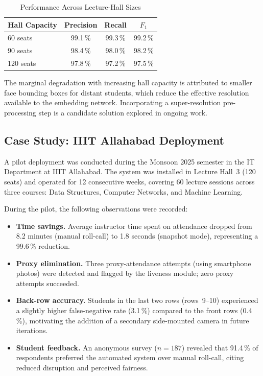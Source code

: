 \documentclass[conference, 10pt]{IEEEtran}
\begin{document}
\begin{table}[htbp]
\centering
\caption{Performance Across Lecture-Hall Sizes}
\label{tab:hall_sizes}
\begin{tabular}{lccc}
\toprule
\textbf{Hall Capacity} & \textbf{Precision} & \textbf{Recall} & \textbf{$F_1$} \\
\midrule
60 seats  & 99.1\,\% & 99.3\,\% & 99.2\,\% \\
90 seats  & 98.4\,\% & 98.0\,\% & 98.2\,\% \\
120 seats & 97.8\,\% & 97.2\,\% & 97.5\,\% \\
\bottomrule
\end{tabular}
\end{table}

The marginal degradation with increasing hall capacity is attributed to smaller face bounding
boxes for distant students, which reduce the effective resolution available to the embedding
network.  Incorporating a super-resolution pre-processing step is a candidate solution
explored in ongoing work.

\subsection{Case Study: IIIT Allahabad Deployment}

A pilot deployment was conducted during the Monsoon 2025 semester in the IT Department at
IIIT Allahabad.  The system was installed in Lecture Hall~3 (120 seats) and operated for
12 consecutive weeks, covering 60 lecture sessions across three courses: Data Structures,
Computer Networks, and Machine Learning.

During the pilot, the following observations were recorded:
\begin{itemize}
    \item \textbf{Time savings.}  Average instructor time spent on attendance dropped from
          8.2 minutes (manual roll-call) to 1.8 seconds (snapshot mode), representing a
          99.6\,\% reduction.
    \item \textbf{Proxy elimination.}  Three proxy-attendance attempts (using smartphone photos)
          were detected and flagged by the liveness module; zero proxy attempts succeeded.
    \item \textbf{Back-row accuracy.}  Students in the last two rows (rows~9--10) experienced a
          slightly higher false-negative rate (3.1\,\%) compared to the front rows (0.4\,\%),
          motivating the addition of a secondary side-mounted camera in future iterations.
    \item \textbf{Student feedback.}  An anonymous survey ($n = 187$) revealed that 91.4\,\% of
          respondents preferred the automated system over manual roll-call, citing reduced
          disruption and perceived fairness.
\end{itemize}
\end{document}
